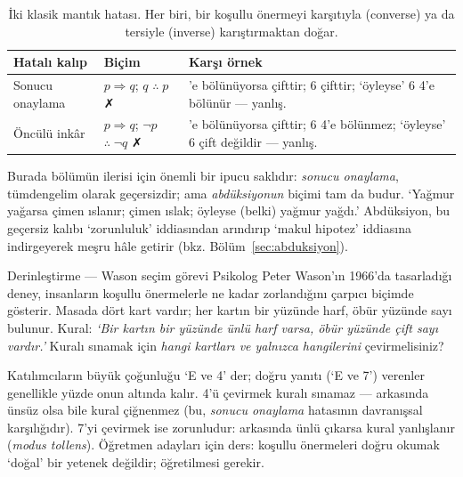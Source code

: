 \begin{table}[h]
\centering\small
\renewcommand{\arraystretch}{1.35}
\begin{tabularx}{\linewidth}{>{\raggedright\arraybackslash}p{3.1cm}>{\raggedright\arraybackslash}p{3.3cm}>{\raggedright\arraybackslash}X}
\toprule
\textbf{Hatalı kalıp} & \textbf{Biçim} & \textbf{Karşı örnek}\\
\midrule
Sonucu onaylama & $p\Rightarrow q$;\; $q$ \;$\therefore\; p$ \;\textcolor{warm}{✗} & 4’e bölünüyorsa çifttir; 6 çifttir; ‘öyleyse’ 6 4’e bölünür — yanlış.\\
Öncülü inkâr & $p\Rightarrow q$;\; $\neg p$ \;$\therefore\; \neg q$ \;\textcolor{warm}{✗} & 4’e bölünüyorsa çifttir; 6 4’e bölünmez; ‘öyleyse’ 6 çift değildir — yanlış.\\
\bottomrule
\end{tabularx}
\caption{İki klasik mantık hatası. Her biri, bir koşullu önermeyi karşıtıyla (converse) ya da tersiyle (inverse) karıştırmaktan doğar.}
\end{table}

Burada bölümün ilerisi için önemli bir ipucu saklıdır: \emph{sonucu onaylama}, tümdengelim olarak geçersizdir; ama \emph{abdüksiyonun} biçimi tam da budur. ‘Yağmur yağarsa çimen ıslanır; çimen ıslak; öyleyse (belki) yağmur yağdı.’ Abdüksiyon, bu geçersiz kalıbı ‘zorunluluk’ iddiasından arındırıp ‘makul hipotez’ iddiasına indirgeyerek meşru hâle getirir (bkz. Bölüm~\ref{sec:abduksiyon}).

\begin{tbox}{Derinleştirme — Wason seçim görevi}
Psikolog Peter Wason’ın 1966’da tasarladığı deney, insanların koşullu önermelerle ne kadar zorlandığını çarpıcı biçimde gösterir. Masada dört kart vardır; her kartın bir yüzünde harf, öbür yüzünde sayı bulunur. Kural: \emph{‘Bir kartın bir yüzünde ünlü harf varsa, öbür yüzünde çift sayı vardır.’} Kuralı sınamak için \emph{hangi kartları ve yalnızca hangilerini} çevirmelisiniz?

\smallskip
\centering
{}

\raggedright\smallskip
Katılımcıların büyük çoğunluğu ‘E ve 4’ der; doğru yanıtı (‘E ve 7’) verenler genellikle yüzde onun altında kalır. 4’ü çevirmek kuralı sınamaz — arkasında ünsüz olsa bile kural çiğnenmez (bu, \emph{sonucu onaylama} hatasının davranışsal karşılığıdır). 7’yi çevirmek ise zorunludur: arkasında ünlü çıkarsa kural yanlışlanır (\emph{modus tollens}). Öğretmen adayları için ders: koşullu önermeleri doğru okumak ‘doğal’ bir yetenek değildir; öğretilmesi gerekir.
\end{tbox}


